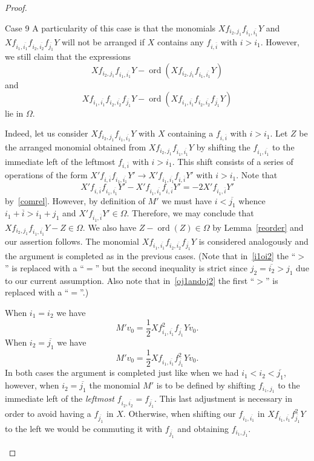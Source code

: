 \documentclass[10pt,a4paper]{article}
\theoremstyle{remark}\newtheorem{rema}[theo]{Remark}
\newenvironment{enonce*}[2][]{\par\smallskip\noindent\textbf{#2.}\ }{\par\smallskip}
\DeclareMathOperator{\ord}{ord}
\begin{document}
\begin{proof}
\begin{enonce*}[remark]{Case 9}
A particularity of this case is that the monomials $Xf_{i_2,j_1}f_{i_1,\overline{i_1}}Y$ and\break $Xf_{i_1,\overline{i_1}}f_{i_2,\overline{i_2}}f_{\overline{j_1}}Y$ will not be arranged if $X$ contains any $f_{i,\overline i}$ with $i>i_1$. However, we still claim that the expressions
\[
Xf_{i_2,j_1}f_{i_1,\overline{i_1}}Y-\ord(Xf_{i_2,j_1}f_{i_1,\overline{i_1}}Y)
\]
and
\[
Xf_{i_1,\overline{i_1}}f_{i_2,\overline{i_2}}f_{\overline{j_1}}Y-\ord(Xf_{i_1,\overline{i_1}}f_{i_2,\overline{i_2}}f_{\overline{j_1}}Y)
\]
lie in $\Omega$.

Indeed, let us consider $Xf_{i_2,j_1}f_{i_1,\overline{i_1}}Y$ with $X$ containing a $f_{i,\overline i}$ with $i>i_1$. Let $Z$ be the arranged monomial obtained from $Xf_{i_2,j_1}f_{i_1,\overline{i_1}}Y$ by shifting the $f_{i_1,\overline{i_1}}$ to the immediate left of the leftmost $f_{i,\overline i}$ with $i>i_1$. This shift consists of a series of operations of the form $X'f_{i,\overline i}f_{i_1,\overline{i_1}}Y'\rightarrow X'f_{i_1,\overline{i_1}}f_{i,\overline i}Y'$ with $i>i_1$. Note that
\[
X'f_{i,\overline i}f_{i_1,\overline{i_1}}Y'-X'f_{i_1,\overline{i_1}}f_{i,\overline i}Y'=-2X'f_{i_1,\overline{i}}Y'
\]
by~\eqref{comrel}. However, by definition of $M'$ we must have $i<\overline{j_1}$ whence $i_1+\overline{i}>i_1+j_1$ and $X'f_{i_1,\overline{i}}Y'\in\Omega$. Therefore, we may conclude that $Xf_{i_2,j_1}f_{i_1,\overline{i_1}}Y-Z\in\Omega$. We also have $Z-\ord(Z)\in\Omega$ by Lemma~\ref{reorder} and our assertion follows. The monomial $Xf_{i_1,\overline{i_1}}f_{i_2,\overline{i_2}}f_{\overline{j_1}}Y$ is considered analogously and the argument is completed as in the previous cases. (Note that in~\eqref{i1oi2} the ``$>$'' is replaced with a ``$=$'' but the second inequality is strict since $j_2=\overline{i_2}>j_1$ due to our current assumption. Also note that in~\eqref{oj1andoj2} the first ``$>$'' is replaced with a ``$=$''.)

When $i_1=i_2$ we have
\[
M'v_0=\frac12Xf_{i_1,\overline{i_1}}^2f_{\overline{j_1}}Yv_0.
\]
When $i_2=\overline{j_1}$ we have
\[
M'v_0=\frac12Xf_{i_1,\overline{i_1}}f_{\overline{j_1}}^2Yv_0.
\]
In both cases the argument is completed just like when we had $i_1<i_2<\overline{j_1}$, however, when $i_2=\overline{j_1}$ the monomial $M'$ is to be defined by shifting $f_{i_1,j_1}$ to the immediate left of the \emph{leftmost} $f_{i_2,\overline{i_2}}=f_{\overline{j_1}}$. This last adjustment is necessary in order to avoid having a $f_{\overline{j_1}}$ in $X$. Otherwise, when shifting our $f_{i_1,\overline{i_1}}$ in $Xf_{i_1,\overline{i_1}}f_{\overline{j_1}}^2Y$ to the left we would be commuting it with $f_{\overline{j_1}}$ and obtaining $f_{i_1,j_1}$.


\end{enonce*}
\end{proof}
\end{document}
